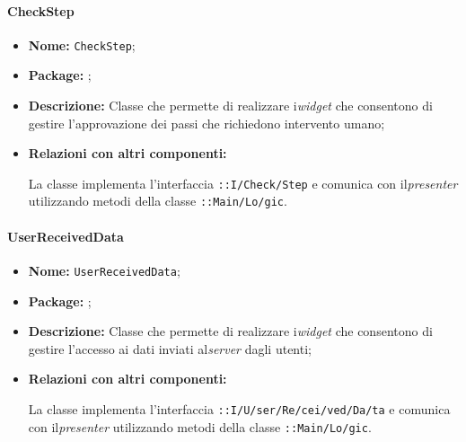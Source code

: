 \paragraph{CheckStep}
\begin{flushleft}
\begin{itemize}
\item \textbf{Nome:} \texttt{CheckStep};
\item \textbf{Package:} \texttt{\viewAdmin{}};
\item \textbf{Descrizione:} Classe che permette di realizzare i\textit{widget} che consentono di gestire l'approvazione dei passi che richiedono intervento umano;
\item \textbf{Relazioni con altri componenti:}
\begin{sloppypar}
La classe implementa l'interfaccia \texttt{\iViewAdmin{}::I\fshyp{}Check\fshyp{}Step} e comunica con il\textit{presenter} utilizzando metodi della classe \texttt{\logicAdmin{}::Main\fshyp{}Lo\fshyp{}gic}.
\end{sloppypar}
\end{itemize}
\end{flushleft}

\paragraph{UserReceivedData}
\begin{flushleft}
\begin{itemize}
\item \textbf{Nome:} \texttt{UserReceivedData};
\item \textbf{Package:} \texttt{\viewAdmin{}};
\item \textbf{Descrizione:} Classe che permette di realizzare i\textit{widget} che consentono di gestire l'accesso ai dati inviati al\textit{server} dagli utenti;
\item \textbf{Relazioni con altri componenti:}
\begin{sloppypar}
La classe implementa l'interfaccia \texttt{\iViewAdmin{}::I\fshyp{}U\fshyp{}ser\fshyp{}Re\fshyp{}cei\fshyp{}ved\fshyp{}Da\fshyp{}ta} e comunica con il\textit{presenter} utilizzando metodi della classe \texttt{\logicAdmin{}::Main\fshyp{}Lo\fshyp{}gic}.
\end{sloppypar}
\end{itemize}
\end{flushleft}

